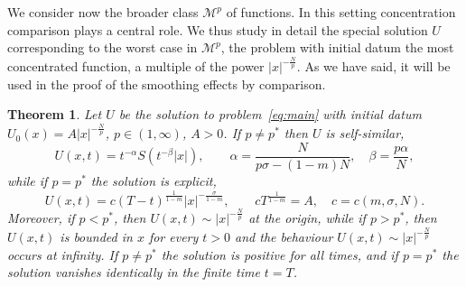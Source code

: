\documentclass[leqno,12pt]{amsart}
\newtheorem{theorem}{Theorem}[section]
\theoremstyle{definition}
\theoremstyle{remark}
\numberwithin{equation}{section}
\begin{document}
We consider now the broader class  $\mathcal{M}^p$ of functions. In this setting concentration comparison plays a central role. We thus study in detail the special solution $U$ corresponding to the worst case in $\mathcal{M}^p$, the problem with initial datum the most concentrated function, a multiple of the power $|x|^{-\frac{N}{p}}$. As we have said, it will be used in the proof of the smoothing effects by comparison.

\begin{theorem}\label{propo:selfsimilar}
Let $U$ be the solution to problem~\eqref{eq:main} with initial datum $U_0(x) = A|x|^{-\frac{N}{p}}$, $p\in(1,\infty)$, $A>0$. If $p\neq p^*$ then $U$ is  self-similar,
\begin{equation}\label{sol-selfsimilar}
U(x,t)=t^{-\alpha}S(t^{-\beta}|x|),
\qquad
\alpha=\frac{N}{p\sigma-(1-m)N},
\quad
\beta=\frac{p\alpha}{N},
\end{equation}
while if $p=p^*$ the solution is explicit,
\begin{equation}\label{sol-extinction}
    U(x,t)=c(T-t)^{\frac{1}{1-m}}|x|^{-\frac{\sigma }{1-m}},\qquad cT^{\frac{1}{1-m}}=A,\quad c=c(m,\sigma,N).
\end{equation}
Moreover, if $ p < p^*$, then $
U(x,t) \sim|x|^{-\frac{N}{p}}$ at the origin, while if  $ p > p^*$, then $U(x,t)$ is bounded in $x$ for every $t>0$ and the behaviour $
U(x,t) \sim|x|^{-\frac{N}{p}}$ occurs at infinity. If $p\neq p^*$ the solution is positive for all times, and if $p=p^*$ the solution vanishes identically in the finite time $t=T$.
\end{theorem}
\end{document}
